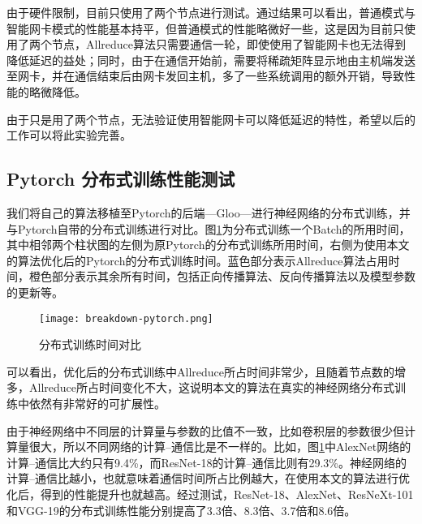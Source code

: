 由于硬件限制，目前只使用了两个节点进行测试。通过结果可以看出，普通模式与智能网卡模式的性能基本持平，但普通模式的性能略微好一些，这是因为目前只使用了两个节点，Allreduce算法只需要通信一轮，即使使用了智能网卡也无法得到降低延迟的益处；同时，由于在通信开始前，需要将稀疏矩阵显示地由主机端发送至网卡，并在通信结束后由网卡发回主机，多了一些系统调用的额外开销，导致性能的略微降低。

由于只是用了两个节点，无法验证使用智能网卡可以降低延迟的特性，希望以后的工作可以将此实验完善。

\subsection{Pytorch 分布式训练性能测试}
我们将自己的算法移植至Pytorch的后端---Gloo---进行神经网络的分布式训练，并与Pytorch自带的分布式训练进行对比。图\ref{fig:breakdown-pytorch}为分布式训练一个Batch的所用时间，其中相邻两个柱状图的左侧为原Pytorch的分布式训练所用时间，右侧为使用本文的算法优化后的Pytorch的分布式训练时间。蓝色部分表示Allreduce算法占用时间，橙色部分表示其余所有时间，包括正向传播算法、反向传播算法以及模型参数的更新等。

\begin{figure}[ht] %
    \centering
    \texttt{[image: breakdown-pytorch.png]}
    \caption{分布式训练时间对比}
    \label{fig:breakdown-pytorch}
  \end{figure}

可以看出，优化后的分布式训练中Allreduce所占时间非常少，且随着节点数的增多，Allreduce所占时间变化不大，这说明本文的算法在真实的神经网络分布式训练中依然有非常好的可扩展性。

由于神经网络中不同层的计算量与参数的比值不一致，比如卷积层的参数很少但计算量很大，所以不同网络的计算--通信比是不一样的。比如，图\ref{fig:breakdown-pytorch}中AlexNet网络的计算--通信比大约只有9.4\%，而ResNet-18的计算--通信比则有29.3\%。神经网络的计算--通信比越小，也就意味着通信时间所占比例越大，在使用本文的算法进行优化后，得到的性能提升也就越高。经过测试，ResNet-18、AlexNet、ResNeXt-101和VGG-19的分布式训练性能分别提高了3.3倍、8.3倍、3.7倍和8.6倍。


